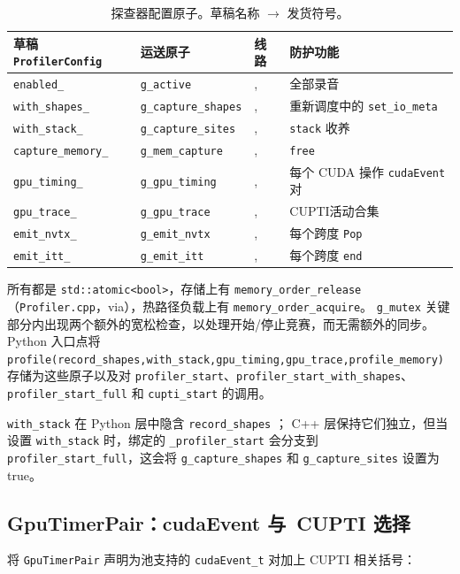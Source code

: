 \begin{table}[H]
\centering
\caption{探查器配置原子。草稿名称 $\rightarrow$ 发货符号。}
\label{tab:profatomics}
\small
\begin{tabular}{llll}
\toprule
草稿 \texttt{ProfilerConfig} & 运送原子 & 线路 & 防护功能 \\
\midrule
\texttt{enabled\_} & \texttt{g\_active} & , & 全部录音 \\
\texttt{with\_shapes\_} & \texttt{g\_capture\_shapes} & , & 重新调度中的 \texttt{set\_io\_meta} \\
\texttt{with\_stack\_} & \texttt{g\_capture\_sites} & , & \texttt{stack} 收养 \\
\texttt{capture\_memory\_} & \texttt{g\_mem\_capture} & , & \texttt{free} \\
\texttt{gpu\_timing\_} & \texttt{g\_gpu\_timing} & , & 每个 CUDA 操作 \texttt{cudaEvent} 对 \\
\texttt{gpu\_trace\_} & \texttt{g\_gpu\_trace} & , & CUPTI活动合集 \\
\texttt{emit\_nvtx\_} & \texttt{g\_emit\_nvtx} & , & 每个跨度 \texttt{Pop} \\
\texttt{emit\_itt\_} & \texttt{g\_emit\_itt} & , & 每个跨度 \texttt{end} \\
\bottomrule
\end{tabular}
\end{table}

所有都是 \texttt{std::atomic<bool>}，存储上有 \texttt{memory\_order\_release}（\texttt{Profiler.cpp}，via），热路径负载上有 \texttt{memory\_order\_acquire}。 \texttt{g\_mutex} 关键部分内出现两个额外的宽松检查，以处理开始/停止竞赛，而无需额外的同步。 Python 入口点将 \texttt{profile(record\_shapes,with\_stack,gpu\_timing,gpu\_trace,profile\_memory)} 存储为这些原子以及对 \texttt{profiler\_start}、\texttt{profiler\_start\_with\_shapes}、\texttt{profiler\_start\_full} 和 \texttt{cupti\_start} 的调用。

\texttt{with\_stack} 在 Python 层中隐含 \texttt{record\_shapes} ； C++ 层保持它们独立，但当设置 \texttt{with\_stack} 时，绑定的 \texttt{\_profiler\_start} 会分支到 \texttt{profiler\_start\_full}，这会将 \texttt{g\_capture\_shapes} 和 \texttt{g\_capture\_sites} 设置为 true。

\subsection{GpuTimerPair：cudaEvent 与\ CUPTI 选择}

将 \texttt{GpuTimerPair} 声明为池支持的 \texttt{cudaEvent\_t} 对加上 CUPTI 相关括号：

